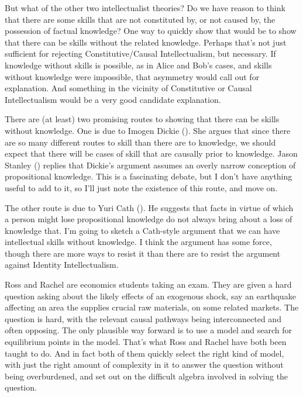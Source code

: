 \documentclass[
  11pt,
  letterpaper,
  DIV=11,
  numbers=noendperiod,
  twoside]{scrartcl}
\begin{document}
But what of the other two intellectualist theories? Do we have reason to
think that there are some skills that are not constituted by, or not
caused by, the possession of factual knowledge? One way to quickly show
that would be to show that there can be skills without the related
knowledge. Perhaps that's not just sufficient for rejecting
Constitutive/Causal Intellectualism, but necessary. If knowledge without
skills is possible, as in Alice and Bob's cases, and skills without
knowledge were impossible, that asymmetry would call out for
explanation. And something in the vicinity of Constitutive or Causal
Intellectualism would be a very good candidate explanation.

There are (at least) two promising routes to showing that there can be
skills without knowledge. One is due to Imogen Dickie
(). She argues that since there are so
many different routes to skill than there are to knowledge, we should
expect that there will be cases of skill that are causally prior to
knowledge. Jason Stanley ()
replies that Dickie's argument assumes an overly narrow conception of
propositional knowledge. This is a fascinating debate, but I don't have
anything useful to add to it, so I'll just note the existence of this
route, and move on.

The other route is due to Yuri Cath (). He
suggests that facts in virtue of which a person might lose propositional
knowledge do not always bring about a loss of knowledge that. I'm going
to sketch a Cath-style argument that we can have intellectual skills
without knowledge. I think the argument has some force, though there are
more ways to resist it than there are to resist the argument against
Identity Intellectualism.

Ross and Rachel are economics students taking an exam. They are given a
hard question asking about the likely effects of an exogenous shock, say
an earthquake affecting an area the supplies crucial raw materials, on
some related markets. The question is hard, with the relevant causal
pathways being interconnected and often opposing. The only plausible way
forward is to use a model and search for equilibrium points in the
model. That's what Ross and Rachel have both been taught to do. And in
fact both of them quickly select the right kind of model, with just the
right amount of complexity in it to answer the question without being
overburdened, and set out on the difficult algebra involved in solving
the question.
\end{document}
